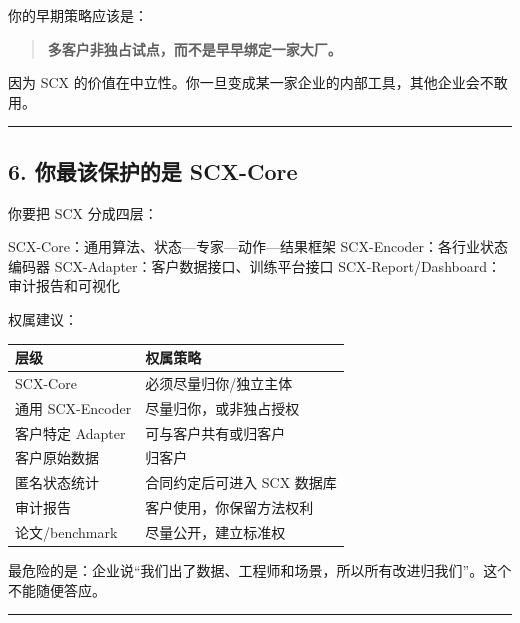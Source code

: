 \documentclass[
  12pt,
]{ctexart}
\newenvironment{Shaded}{}{}
\newcommand{\NormalTok}[1]{#1}
\begin{document}
你的早期策略应该是：

\begin{quote}
\textbf{多客户非独占试点，而不是早早绑定一家大厂。}
\end{quote}

因为 SCX
的价值在中立性。你一旦变成某一家企业的内部工具，其他企业会不敢用。

\begin{center}\rule{0.5\linewidth}{0.5pt}\end{center}

\subsection{6. 你最该保护的是
SCX-Core}\label{ux4f60ux6700ux8be5ux4fddux62a4ux7684ux662f-scx-core}

你要把 SCX 分成四层：

\begin{Shaded}
\begin{Highlighting}[]
\NormalTok{SCX{-}Core：通用算法、状态—专家—动作—结果框架}
\NormalTok{SCX{-}Encoder：各行业状态编码器}
\NormalTok{SCX{-}Adapter：客户数据接口、训练平台接口}
\NormalTok{SCX{-}Report/Dashboard：审计报告和可视化}
\end{Highlighting}
\end{Shaded}

权属建议：

\begin{longtable}[]{@{}ll@{}}
\toprule\noalign{}
层级 & 权属策略 \\
\midrule\noalign{}
\endhead
\bottomrule\noalign{}
\endlastfoot
SCX-Core & 必须尽量归你/独立主体 \\
通用 SCX-Encoder & 尽量归你，或非独占授权 \\
客户特定 Adapter & 可与客户共有或归客户 \\
客户原始数据 & 归客户 \\
匿名状态统计 & 合同约定后可进入 SCX 数据库 \\
审计报告 & 客户使用，你保留方法权利 \\
论文/benchmark & 尽量公开，建立标准权 \\
\end{longtable}

最危险的是：企业说``我们出了数据、工程师和场景，所以所有改进归我们''。这个不能随便答应。

\begin{center}\rule{0.5\linewidth}{0.5pt}\end{center}
\end{document}
